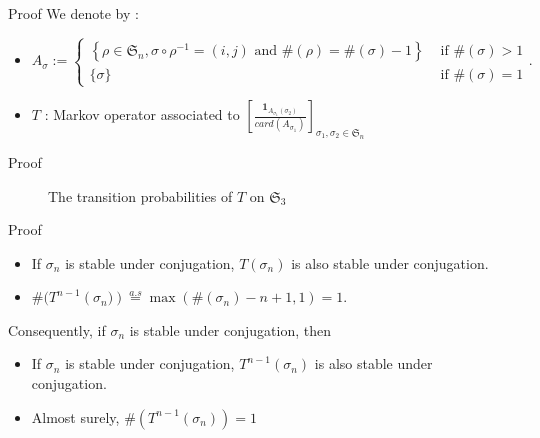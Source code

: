 \documentclass[english]{beamer}
\begin{document}
\begin{frame}{Proof}
We denote by :
\begin{itemize}
    \item $A_\sigma :=
    \begin{cases}
        \left\{\rho\in\mathfrak{S}_n, \sigma\circ\rho^{-1}=(i,j)  \text{ and }  \#(\rho)=\#(\sigma)-1 \right\} & \text{ if } \#(\sigma)>1
        \\ \{\sigma\} & \text{ if } \#(\sigma)=1
    \end{cases}.
    $
    \item $T$ : Markov operator associated to  $\left[\frac{\mathbf{1}_{A_{\sigma_1}(\sigma_2)}}{card(A_{\sigma_1})}\right]_{\sigma_1,\sigma_2\in \mathfrak{S}_n}$
\end{itemize}

\end{frame}
\begin{frame}{Proof}
\begin{figure}[H]
\centering
{}
    \caption{The transition probabilities of $T$ on $\mathfrak{S}_3$}
    \label{figm}
\end{figure}
\end{frame}
\begin{frame}{Proof}
    \begin{itemize}
        \item If $\sigma_n$ is stable under conjugation, $T(\sigma_n)$ is also stable under conjugation.
        \item $
\#(T^{n-1} \left(\sigma_{n})\right)\overset{a.s}{=}\max(\#(\sigma_n)-n+1,1)=1. $  
    \end{itemize}
    Consequently, if $\sigma_n$ is stable under conjugation, then 
    \begin{itemize}
        \item If $\sigma_n$ is stable under conjugation, $T^{n-1}(\sigma_n)$ is also stable under conjugation.
        \item Almost surely, $\#\left(T^{n-1}(\sigma_n)\right)=1$
    \end{itemize}
\end{frame}
\end{document}
